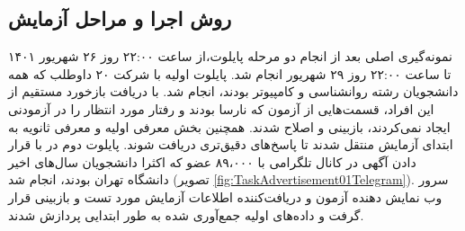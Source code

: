 \subsection{روش اجرا و مراحل آزمایش}
نمونه‌گیری اصلی بعد از انجام دو مرحله پایلوت،از ساعت ۲۲:۰۰ روز ۲۶ شهریور ۱۴۰۱ تا ساعت ۲۲:۰۰ روز ۲۹ شهریور انجام شد. 
پایلوت اولیه با شرکت ۲۰  داوطلب که همه دانشجویان رشته روانشناسی و کامپیوتر بودند، انجام شد. با دریافت بازخورد مستقیم از این افراد، قسمت‌هایی از 
آزمون که نارسا بودند و رفتار مورد انتظار را در آزمودنی ایجاد نمی‌کردند، بازبینی و اصلاح شدند. همچنین بخش معرفی اولیه و معرفی ثانویه به ابتدای آزمایش منتقل شدند تا پاسخ‌های
دقیق‌تری دریافت شوند. پایلوت دوم در با قرار دادن آگهی در کانال تلگرامی با ۸۹،۰۰۰ عضو که اکثرا دانشجویان سال‌های اخیر دانشگاه تهران بودند، انجام شد
(\!تصویر \ref{fig:TaskAdvertisement01Telegram}).
سرور وب نمایش دهنده آزمون و دریافت‌کننده  اطلاعات آزمایش مورد تست و بازبینی قرار گرفت و داده‌های اولیه جمع‌آوری شده به طور ابتدایی پردازش شدند.
 
